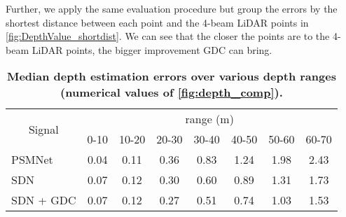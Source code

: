Further, we apply the same evaluation procedure but group the errors by the shortest distance between each \PL point and the 4-beam LiDAR points in \autoref{fig:DepthValue_shortdist}. We can see that the closer the \PL points are to the 4-beam LiDAR points, the bigger improvement GDC can bring.

\begin{table}[t]
	\centering
	\caption{\textbf{Median depth estimation errors over various depth ranges (numerical values of \autoref{fig:depth_comp}).} \label{tbDepthValue}}
	\begin{tabular}{l|c|c|c|c|c|c|c}
		\multicolumn{1}{c|}{\multirow{2}{*}{Signal}} & \multicolumn{7}{c}{range (m)}                                                                                                                                                                         \\ \cline{2-8}
		\multicolumn{1}{c|}{}                        & \multicolumn{1}{c|}{0-10} & \multicolumn{1}{c|}{10-20} & \multicolumn{1}{c|}{20-30} & \multicolumn{1}{c|}{30-40} & \multicolumn{1}{c|}{40-50} & \multicolumn{1}{c|}{50-60} & \multicolumn{1}{c}{60-70} \\ \hline
		PSMNet                       & 0.04                      & 0.11                       & 0.36                       & 0.83                       & 1.24                       & 1.98                       & 2.43                      \\
		SDN                                          & 0.07                      & 0.12                       & 0.30                       & 0.60                       & 0.89                       & 1.31                       & 1.73                      \\
		SDN + GDC                                    & 0.07                      & 0.12                       & 0.27                       & 0.51                       & 0.74                       & 1.03                       & 1.53                      \\ \hline
	\end{tabular}
\end{table}
